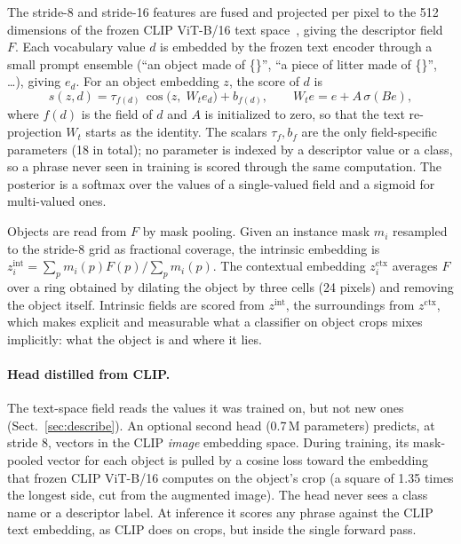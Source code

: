 \documentclass[pdflatex,sn-basic,Numbered]{sn-jnl}%
\begin{document}
The stride-8 and stride-16 features are fused and projected per pixel to the 512 dimensions of the frozen CLIP ViT-B/16 text space~\cite{radford2021clip}, giving the descriptor field $F$. Each vocabulary value $d$ is embedded by the frozen text encoder through a small prompt ensemble (``an object made of \{\}'', ``a piece of litter made of \{\}'', \dots), giving $e_d$. For an object embedding $z$, the score of $d$ is
\begin{equation}
s(z,d) = \tau_{f(d)}\,\cos\!\big(z,\;W_t e_d\big) + b_{f(d)}, \qquad W_t e = e + A\,\sigma(B e),\label{eq:score}
\end{equation}
where $f(d)$ is the field of $d$ and $A$ is initialized to zero, so that the text re-projection $W_t$ starts as the identity. The scalars $\tau_f, b_f$ are the only field-specific parameters (18 in total); no parameter is indexed by a descriptor value or a class, so a phrase never seen in training is scored through the same computation. The posterior is a softmax over the values of a single-valued field and a sigmoid for multi-valued ones.

Objects are read from $F$ by mask pooling. Given an instance mask $m_i$ resampled to the stride-8 grid as fractional coverage, the intrinsic embedding is $z_i^{\mathrm{int}} = \sum_p m_i(p)F(p)/\sum_p m_i(p)$. The contextual embedding $z_i^{\mathrm{ctx}}$ averages $F$ over a ring obtained by dilating the object by three cells (24 pixels) and removing the object itself. Intrinsic fields are scored from $z^{\mathrm{int}}$, the surroundings from $z^{\mathrm{ctx}}$, which makes explicit and measurable what a classifier on object crops mixes implicitly: what the object is and where it lies.

\paragraph{Head distilled from CLIP.} The text-space field reads the values it was trained on, but not new ones (Sect.~\ref{sec:describe}). An optional second head (0.7\,M parameters) predicts, at stride 8, vectors in the CLIP \emph{image} embedding space. During training, its mask-pooled vector for each object is pulled by a cosine loss toward the embedding that frozen CLIP ViT-B/16 computes on the object's crop (a square of 1.35 times the longest side, cut from the augmented image). The head never sees a class name or a descriptor label. At inference it scores any phrase against the CLIP text embedding, as CLIP does on crops, but inside the single forward pass.
\end{document}
